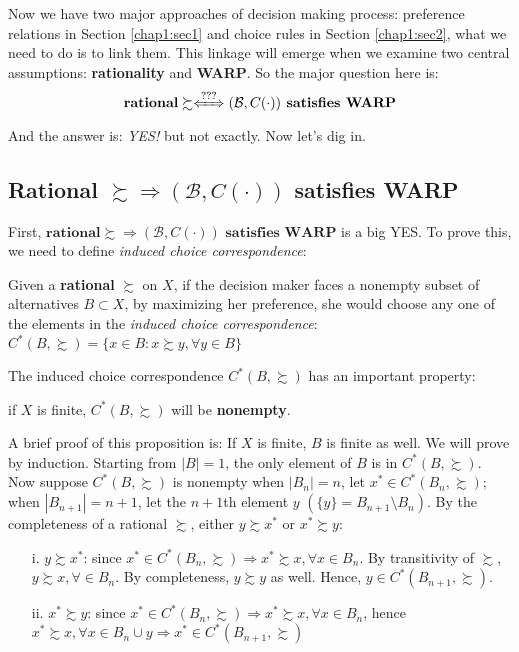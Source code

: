 Now we have two major approaches of decision making process: preference relations in Section \ref{chap1:sec1} and choice rules in Section \ref{chap1:sec2},
what we need to do is to link them. This linkage will emerge when we examine two central assumptions: \textbf{rationality} and \textbf{WARP}. So the major question here is: 
$$\textbf{rational}\succsim\xLeftrightarrow{???} (\mathcal{B},C(\cdot))\textbf{ satisfies WARP}$$
And the answer is: \textit{YES!} but not exactly. Now let's dig in.

\subsection*{Rational $\succsim\Rightarrow(\mathcal{B},C(\cdot))$ satisfies WARP}

First, $\textbf{rational}\succsim \Rightarrow (\mathcal{B},C(\cdot))\textbf{ satisfies WARP}$ is a big YES. To prove this, we need to define \textit{induced choice correspondence}:
\begin{definition}
    Given a \textbf{rational} $\succsim$ on $X$, if the decision maker faces a nonempty subset of alternatives $B\subset X$, by maximizing her preference, she would choose any one of the elements in the 
    \textit{induced choice correspondence}: $C^*(B,\succsim)=\{x\in B:x\succsim y, \forall y\in B\}$
\end{definition}

The induced choice correspondence $C^*(B,\succsim)$ has an important property: 
\begin{theorem}
    if $X$ is finite, $C^*(B,\succsim)$ will be \textbf{nonempty}.
\end{theorem}

A brief proof of this proposition is: If $X$ is finite, $B$ is finite as well. We will prove by induction. Starting from $|B|=1$, the only element of $B$ is in $C^*(B,\succsim)$. Now suppose $C^*(B,\succsim)$ is nonempty when $|B_n|=n$, 
let $x^*\in C^*(B_n,\succsim)$; when $|B_{n+1}|=n+1$, let the $n+1$th element $y$ $(\{y\}=B_{n+1}\setminus B_n)$. By the completeness of a rational $\succsim$, either $y\succsim x^*$ or $x^*\succsim y$:
\begin{enumerate}
    \item[i.] $y\succsim x^*$: since $x^*\in C^*(B_n,\succsim)\Rightarrow x^*\succsim x, \forall x\in B_n$. By transitivity of $\succsim$, $y\succsim x,\forall\in B_n$. By completeness, $y\succsim y$ as well. Hence, $y\in C^*(B_{n+1},\succsim)$.
    \item[ii.] $x^*\succsim y$: since $x^*\in C^*(B_n,\succsim)\Rightarrow x^*\succsim x, \forall x\in B_n$, hence $x^*\succsim x, \forall x\in B_n\cup{y}\Rightarrow x^*\in C^*(B_{n+1},\succsim)$
\end{enumerate}

